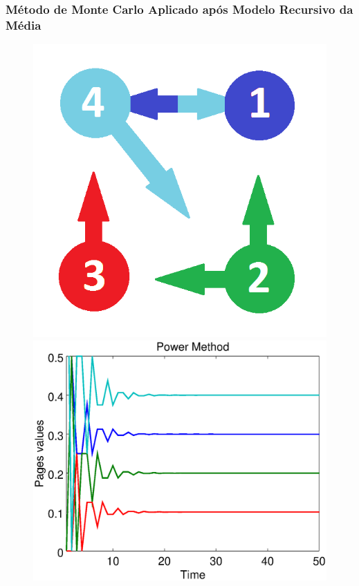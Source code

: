 \documentclass{beamer}
\begin{document}
\begin{frame}
	\frametitle{Método de Monte Carlo Aplicado após Modelo Recursivo da Média}
	
	\vspace{-0.5cm}
\begin{figure}[!htb]
	\centering
	\includegraphics[scale=0.2]{figures/grafo}
	\hspace{1cm}
	\includegraphics[scale=0.2]{figures/50/powermetod.eps}\\

\end{figure}
\end{frame}
\end{document}
